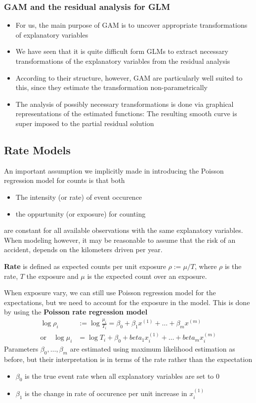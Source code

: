 \subsubsection{GAM and the residual analysis for GLM}
\begin{itemize}
\item For us,
the main purpose of GAM is to uncover appropriate transformations of
explanatory variables
\item We have seen that it is quite difficult form GLMs to extract necessary
transformations of the explanatory variables from the residual analysis
\item According to their structure, however,
GAM are particularly well suited to this,
since they estimate the transformation non-parametrically
\item The analysis of possibly necessary transformations is done via graphical
representations of the estimated functions:
The resulting smooth curve is super imposed to the partial residual solution
\end{itemize}

\subsection{Rate Models}
An important assumption we implicitly made in introducing the Poisson
regression model for counts is that both
\begin{itemize}
\item The intensity (or rate) of event occurence
\item the oppurtunity (or exposure) for counting
\end{itemize}
are constant for all available observations with the same explanatory
variables.
When modeling however,
it may be reasonable to assume that the risk of an accident,
depends on the kilometers driven per year.

\textbf{Rate} is defined as expected counts per unit exposure
$\rho := \mu / T$,
where $\rho$ is the rate,
$T$ the exposure and $\mu$ is the expected count over an exposure.

When exposure vary,
we can still use Poisson regression model for the expectations,
but we need to account for the exposure in the model.
This is done by using the \textbf{Poisson rate regression model}
\begin{align*}
\log\rho_i
 & :=
\log\frac{\mu_i}{T_i}
=
\beta_0 + \beta_1 x^{(1)} + \ldots + \beta_m x^{(m)} \\
\text{or}\quad
\log\mu_i
 & =
\log T_i + \beta_0 + beta_1 x_i^{(1)} + \ldots + beta_m x_i^{(m)}
\end{align*}
Parameters $\beta_0,\ldots,\beta_m$ are estimated
using maximum likelihood estimation as before,
but their interpretation is in terms of the rate rather than the expectation
\begin{itemize}
\item $\beta_0$ is the true event rate when all explanatory variables are set
to $0$
\item $\beta_1$ is the change in rate of occurence per unit increase in
$x_i^{(1)}$
\end{itemize}

